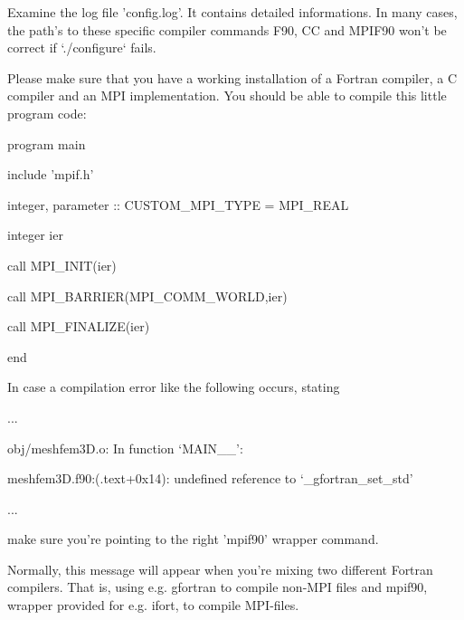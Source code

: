 \documentclass[oneside,english]{book}
\newenvironment{lyxcode}
{\begin{list}{}{
\setlength{\rightmargin}{\leftmargin}
\setlength{\listparindent}{0pt}%
\raggedright
\setlength{\itemsep}{0pt}
\setlength{\parsep}{0pt}
\normalfont\ttfamily}%
 \item[]}
{\end{list}}
\begin{document}
\begin{description}
\item [configuration fails:]
   Examine the log file 'config.log'. It contains detailed informations.
   In many cases, the path's to these specific compiler commands F90,
   CC and MPIF90 won't be correct if `./configure` fails.

   Please make sure that you have a working installation of a Fortran compiler,
   a C compiler and an MPI implementation. You should be able to compile this
   little program code:
\begin{lyxcode}
{\footnotesize      program main }{\footnotesize \par}
{\footnotesize        include 'mpif.h' }{\footnotesize \par}
{\footnotesize        integer, parameter :: CUSTOM\_MPI\_TYPE = MPI\_REAL }{\footnotesize \par}
{\footnotesize        integer ier }{\footnotesize \par}
{\footnotesize        call MPI\_INIT(ier) }{\footnotesize \par}
{\footnotesize        call MPI\_BARRIER(MPI\_COMM\_WORLD,ier) }{\footnotesize \par}
{\footnotesize        call MPI\_FINALIZE(ier) }{\footnotesize \par}
{\footnotesize      end}{\footnotesize \par}
\end{lyxcode}


\item [compilation fails:] In case a compilation error like the following occurs, stating
\begin{lyxcode}
{\footnotesize    ...  }{\footnotesize \par}
{\footnotesize    obj/meshfem3D.o: In function `MAIN\_\_':  }{\footnotesize \par}
{\footnotesize    meshfem3D.f90:(.text+0x14): undefined reference to `\_gfortran\_set\_std'  }{\footnotesize \par}
{\footnotesize    ...  }{\footnotesize \par}
\end{lyxcode}
  make sure you're pointing to the right 'mpif90' wrapper command.

  Normally, this message will appear when you're mixing two different Fortran
  compilers. That is, using e.g. gfortran to compile non-MPI files
  and mpif90, wrapper provided for e.g. ifort, to compile MPI-files.


\end{description}
\end{document}
